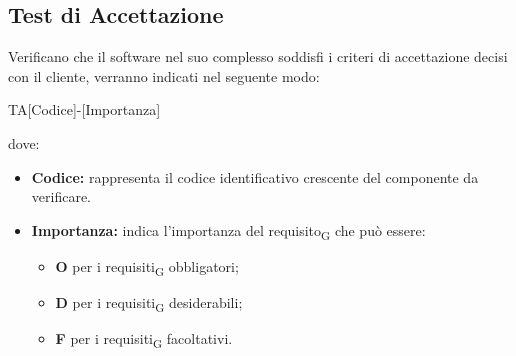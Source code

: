 \subsection{Test di Accettazione}
Verificano che il software nel suo complesso soddisfi i criteri di accettazione decisi con il cliente, verranno indicati nel seguente modo:\\
\begin{center}
	TA[Codice]-[Importanza]\\
\end{center}
dove:
\begin{itemize}
	\item \textbf{Codice:} rappresenta il codice identificativo crescente del componente da verificare.
	\item \textbf{Importanza:} indica l'importanza del requisito\textsubscript{G} che può essere:
		\begin{itemize}
			\item \textbf{O} per i requisiti\textsubscript{G} obbligatori;
			\item \textbf{D} per i requisiti\textsubscript{G} desiderabili;
			\item \textbf{F} per i requisiti\textsubscript{G} facoltativi.
		\end{itemize}
\end{itemize}


